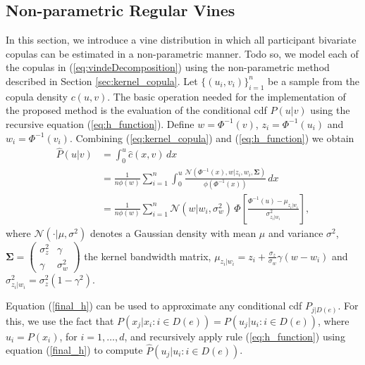 \documentclass{article}
\begin{document}
\subsection{Non-parametric Regular Vines}
In this section, we introduce a vine distribution in which all participant
bivariate copulas can be estimated in a non-parametric manner.  Todo so, we
model each of the copulas in (\ref{eq:vindeDecomposition}) using the
non-parametric method described in Section \ref{sec:kernel_copula}.  Let
$\{(u_i,v_i)\}_{i=1}^n$ be a sample from the copula density $c(u,v)$.  The
basic operation needed for the implementation of the proposed method is the
evaluation of the conditional cdf $P(u|v)$ using the recursive equation
(\ref{eq:h_function}).  Define $w=\Phi^{-1}(v)$, $z_i=\Phi^{-1}(u_i)$ and
$w_i=\Phi^{-1}(v_i)$.  Combining (\ref{eq:kernel_copula}) and
(\ref{eq:h_function}) we obtain
\begin{align}
\hat{P}(u|v) & = \int_{0}^u \hat{c}(x,v) \,dx \nonumber\\
&= \frac{1}{n \phi(w)} \sum_{i=1}^n{\int_{0}^{u}
\frac{\mathcal{N}(\Phi^{-1}(x),w| z_i, w_i,
\mathbf{\Sigma})}{\phi(\Phi^{-1}(x))}\,dx} \nonumber\\
&= \frac{1}{n\phi(w)} \sum_{i=1}^n \mathcal{N}(w| w_i, \sigma_w^2)\,\Phi\left[
\frac{\Phi^{-1}(u) - \mu_{z_i|w_i}}{\sigma^2_{z_i|w_i}} \right],\label{final_h}
\end{align}
where $\mathcal{N}(\cdot|\mu,\sigma^2)$ denotes a Gaussian density with mean
$\mu$ and variance $\sigma^2$, $\bm \Sigma = \left(\begin{array}{cc} \sigma^2_z
& \gamma\\ \gamma &\sigma^2_w\end{array}\right)$ the kernel bandwidth matrix,
$\mu_{z_i|w_i} = z_i + \frac{\sigma_z}{\sigma_w}\gamma (w - w_i)$ and
$\sigma^2_{z_i|w_i} = \sigma_z^2 (1 -\gamma^2)$.

Equation (\ref{final_h}) can be used to approximate any conditional cdf
$P_{j|D(e)}$.  For this, we use the fact that $P(x_j|x_i : i \in
D(e))=P(u_j|u_i : i \in D(e))$, where $u_i = P(x_i)$, for $i = 1,\ldots,d$, and
recursively apply rule (\ref{eq:h_function}) using equation (\ref{final_h}) to
compute $\hat{P}(u_j|u_i : i \in D(e))$.
\end{document}
